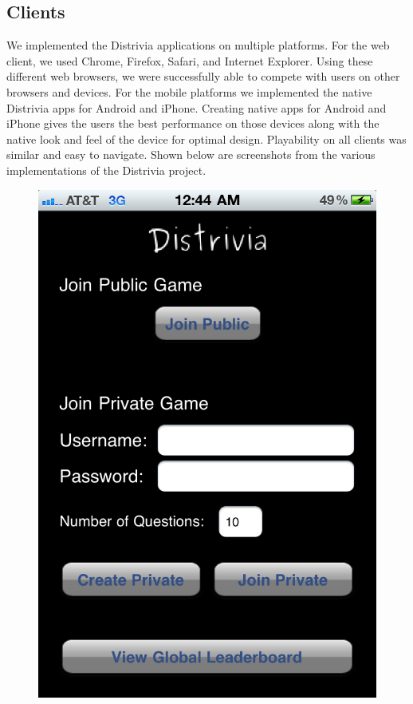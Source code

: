 \documentclass{dependencies/acm_proc_article-sp}
\begin{document}
\subsection{Clients}
We implemented the Distrivia applications on multiple platforms.
For the web client, we used Chrome, Firefox, Safari, and Internet Explorer.
Using these different web browsers, we were successfully able to compete with users on other browsers and devices.
For the mobile platforms we implemented the native Distrivia apps for Android and iPhone.
Creating native apps for Android and iPhone gives the users the best performance on those devices along with the native look and feel of the device for optimal design.
Playability on all clients was similar and easy to navigate. Shown below are screenshots from the various implementations of the Distrivia project.
\begin{figure}[h!]
   \includegraphics[scale=0.12]{iPhone_join.png}

\end{figure}
\end{document}
